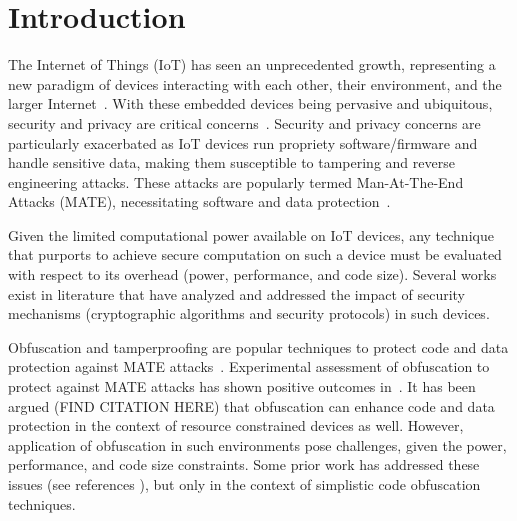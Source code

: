 \section{Introduction}
The Internet of Things (IoT) has seen an unprecedented growth, representing a new paradigm of devices interacting with each other, their environment, and the larger Internet~\cite{ATZORI20102787}. With these embedded devices being pervasive and ubiquitous, security and privacy are critical concerns~\cite{weber2010internet,7054433}. Security and privacy concerns are particularly exacerbated as IoT devices run propriety software/firmware and handle sensitive data, making them susceptible to tampering and reverse engineering attacks. These attacks are popularly termed Man-At-The-End Attacks (MATE), necessitating software and data protection~\cite{falcarin2011guest}.

Given the limited computational power available on IoT devices, any technique that purports to achieve secure computation on such a device must be evaluated with respect to its overhead (power, performance, and code size). Several works exist in literature that have analyzed and addressed the impact of security mechanisms (cryptographic algorithms and security protocols) in such devices.    

Obfuscation and tamperproofing are popular techniques to protect code and data protection against MATE attacks~\cite{collberg_surreptitious_2010}. Experimental assessment of obfuscation to protect against MATE attacks has shown positive outcomes in~\cite{5090041,7781792}. It has been argued (FIND CITATION HERE) that obfuscation can enhance code and data protection in the context of resource constrained devices as well. However, application of obfuscation in such environments pose challenges, given the power, performance, and code size constraints. Some prior work has addressed these issues (see references \cite{6976079,dhukovic2015load,raj2017modelling}), but only in the context of simplistic code obfuscation techniques.

